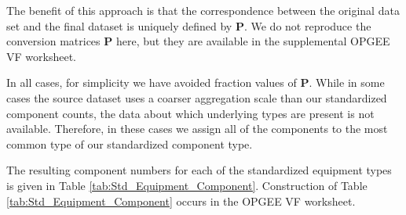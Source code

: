 \documentclass[11pt]{report}
\begin{document}
The benefit of this approach is that the correspondence between the original data set and the final dataset is uniquely defined by \textbf{P}. We do not reproduce the conversion matrices \textbf{P} here, but they are available in the supplemental OPGEE VF worksheet.

In all cases, for simplicity we have avoided fraction values of \textbf{P}. While in some cases the source dataset uses a coarser aggregation scale than our standardized component counts, the data about which underlying types are present is not available. Therefore, in these cases we assign all of the components to the most common type of our standardized component type. 

The resulting component numbers for each of the standardized equipment types is given in Table \ref{tab:Std_Equipment_Component}. Construction of Table \ref{tab:Std_Equipment_Component} occurs in the OPGEE VF worksheet.
\end{document}
